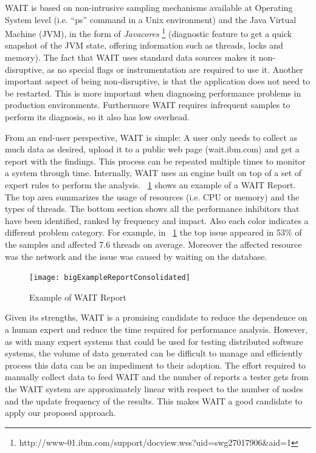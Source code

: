 \documentclass[runningheads,a4paper]{llncs}
\begin{document}
WAIT is based on non-intrusive sampling mechanisms available at
Operating System level (i.e. ``ps'' command in a Unix environment) and the Java
Virtual Machine (JVM), in the form of \emph{Javacores}
\footnote{http://www-01.ibm.com/support/docview.wss?uid=swg27017906\&aid=1}
(diagnostic feature to get a quick snapshot of the JVM state, offering
information such as threads, locks and memory). The fact that WAIT uses standard
data sources makes it non-disruptive, as no special flags or instrumentation are
required to use it. Another important aspect of being non-disruptive, is that
the application does not need to be restarted. This is more important when diagnosing performance
problems in production environments. Furthermore WAIT requires infrequent
samples to perform its diagnosis, so it also has low overhead.

From an end-user perspective, WAIT is simple: A user only needs to
collect as much data as desired, upload it to a public web page (wait.ibm.com)
and get a report with the findings. This process can be repeated multiple times to monitor a
system through time. Internally, WAIT uses an engine built on top of a set of 
expert rules to perform the analysis. \figurename ~\ref{fig_WAITReport} shows an
example of a WAIT Report. The top area summarizes the usage of resources (i.e.
CPU or memory) and the types of threads. The bottom section shows all
the performance inhibitors that have been identified, ranked by frequency and impact. 
Also each color indicates a different problem category. For example, in
\figurename ~\ref{fig_WAITReport} the top issue appeared in 53\% of the samples
and affected 7.6 threads on average. Moreover the affected resource was the
network and the issue was caused by waiting on the database.

\begin{figure}[!h]
\centering
\texttt{[image: bigExampleReportConsolidated]}
\caption{Example of WAIT Report}
\label{fig_WAITReport}
\end{figure}

Given its strengths, WAIT is a promising candidate to reduce the
dependence on a human expert and reduce the time required for performance 
analysis. However, as with many expert systems that could be used for testing 
distributed software systems, the volume of data generated can be difficult to 
manage and efficiently process this data can be an impediment to their
adoption. The effort required to manually collect data to feed WAIT and the number 
of reports a tester gets from the WAIT system are approximately linear with
respect to the number of nodes and the update frequency of the results. This makes 
WAIT a good candidate to apply our proposed approach.
\end{document}
